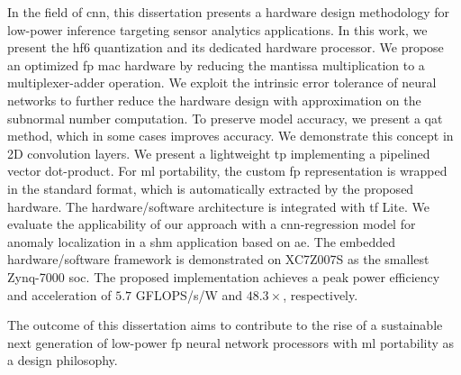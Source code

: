 In the field of \gls{cnn}, this dissertation presents a hardware design methodology for low-power inference targeting sensor analytics applications. In this work, we present the \gls{hf6} quantization and its dedicated hardware processor. We propose an optimized \gls{fp} \gls{mac} hardware by reducing the mantissa multiplication to a multiplexer-adder operation. We exploit the intrinsic error tolerance of neural networks to further reduce the hardware design with approximation on the subnormal number computation. To preserve model accuracy, we present a \gls{qat} method, which in some cases improves accuracy. We demonstrate this concept in 2D convolution layers. We present a lightweight \gls{tp} implementing a pipelined vector dot-product. For \gls{ml} portability, the custom \gls{fp} representation is wrapped in the standard format, which is automatically extracted by the proposed hardware. The hardware/software architecture is integrated with \gls{tf} Lite. We evaluate the applicability of our approach with a \gls{cnn}-regression model for anomaly localization in a \gls{shm} application based on \gls{ae}. The embedded hardware/software framework is demonstrated on XC7Z007S as the smallest Zynq-7000 \gls{soc}. The proposed implementation achieves a peak power efficiency and acceleration of $5.7$ GFLOPS/s/W and $48.3\times$, respectively.

The outcome of this dissertation aims to contribute to the rise of a sustainable next generation of low-power \gls{fp} neural network processors with \gls{ml} portability as a design philosophy.




